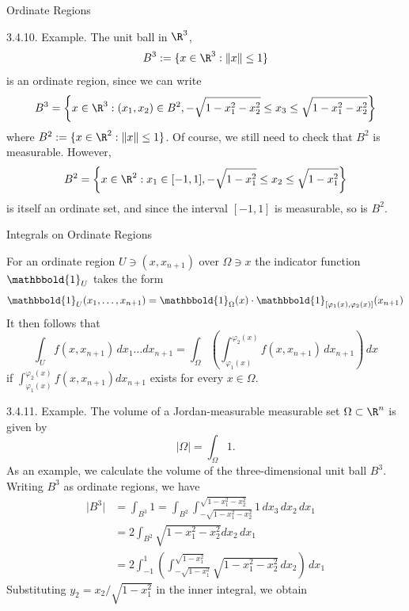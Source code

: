 \documentclass[smaller,hyperref={CJKbookmarks=true}]{beamer}
\begin{document}
\begin{frame}[t]{Ordinate Regions}
\begin{spacing}{1.05}
\alert{3.4.10. Example.} The unit ball in $\R^3$,
\[B^3:=\{x\in\R^3:\|x\|\leq1\}\]
is an ordinate region, since we can write
\[B^3=\left\{x\in\R^3:(x_1,x_2)\in B^2,-\sqrt{1-x_1^2-x_2^2}\leq x_3\leq\sqrt{1-x_1^2-x_2^2}\right\}\]
where $B^2:=\{x\in\R^2:\|x\|\leq1\}$. Of course, we still need to check that $B^2$ is measurable. However,
\[B^2=\left\{x\in\R^2:x_1\in[-1,1],
-\sqrt{1-x_1^2}\leq x_2\leq\sqrt{1-x_1^2}\right\}\]
is itself an ordinate set, and since the interval $[-1,1]$ is measurable, so is $B^2$.
\end{spacing}
\end{frame}
\begin{frame}{Integrals on Ordinate Regions}
\begin{spacing}{1.1}
\vspace*{14pt}
For an ordinate region $U\ni(x,x_{n+1})$ over $\Omega\ni x$ the indicator function $\mathbbold{1}_U$ takes the form
\[\mathbbold{1}_U(x_1,\ldots,x_{n+1})=\mathbbold{1}_\Omega(x)
\cdot\mathbbold{1}_{[\varphi_1(x),\varphi_2(x)]}(x_{n+1})\]
It then follows that
\[\int_Uf(x,x_{n+1})\,dx_1\ldots dx_{n+1}=\int_\Omega\left(\int_{\varphi_1(x)}^{\varphi_2(x)}
f(x,x_{n+1})\,dx_{n+1}\right)\,dx\]
if $\int_{\varphi_1(x)}^{\varphi_2(x)}f(x,x_{n+1})dx_{n+1}$ exists for every $x\in\Omega$.
\end{spacing}
\newpage
\begin{spacing}{0.9}
\alert{3.4.11. Example.} The volume of a Jordan-measurable measurable set $\Omega\subset\R^n$ is given by
\[|\Omega|=\int_\Omega1.\]
As an example, we calculate the volume of the three-dimensional unit ball $B^3$. Writing $B^3$ as ordinate regions, we have
\begin{equation*}
  \begin{split}
     \vert B^3\vert &=\int_{B^3}1=
     \int_{B^2}\int_{-\sqrt{1-x_1^2-x_2^2}}^{\sqrt{1-x_1^2-x_2^2}}
     1\,dx_3\,dx_2\,dx_1 \\
       &=2\int_{B^2}\sqrt{1-x_1^2-x_2^2}dx_2\,dx_1 \\
       &=2\int_{-1}^{1}\left(\int_{-\sqrt{1-x_1^2}}^{\sqrt{1-x_1^2}}
       \sqrt{1-x_1^2-x_2^2}\,dx_2\right)\,dx_1
  \end{split}
\end{equation*}
Substituting $y_2=x_2/\sqrt{1-x_1^2}$ in the inner integral, we obtain
\end{spacing}
\newpage
\begin{spacing}{0.7}

\end{spacing}
\end{frame}
\end{document}
